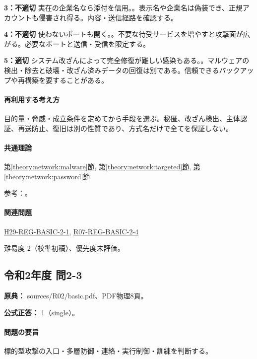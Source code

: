 \noindent\textbf{3：不適切} 実在の企業名なら添付を信用。。表示名や企業名は偽装でき、正規アカウントも侵害され得る。内容・送信経路を確認する。\par

\noindent\textbf{4：不適切} 使わないポートも開く。。不要な待受サービスを増やすと攻撃面が広がる。必要なポートと送信・受信を限定する。\par

\noindent\textbf{5：適切} システム改ざんによって完全修復が難しい感染もある。。マルウェアの検出・除去と破壊・改ざん済みデータの回復は別である。信頼できるバックアップや再構築を要することがある。\par

\paragraph{再利用する考え方} 目的量・脅威・成立条件を定めてから手段を選ぶ。秘匿、改ざん検出、主体認証、再送防止、復旧は別の性質であり、方式名だけで全てを保証しない。

\paragraph{共通理論} \hyperref[theory:network:malware]{第\ref*{theory:network:malware}節}, \hyperref[theory:network:targeted]{第\ref*{theory:network:targeted}節}, \hyperref[theory:network:password]{第\ref*{theory:network:password}節}

\par 参考：\cite{net_target2020,net_ipa_account}。

\paragraph{関連問題} \hyperref[q:h29-reg-basic-2-1]{H29-REG-BASIC-2-1}, \hyperref[q:r07-reg-basic-2-4]{R07-REG-BASIC-2-4}

\par 難易度 2（校準初稿）、優先度未評価。

\subsection{令和2年度 問2-3}
\label{q:r02-reg-basic-2-3}

\noindent\textbf{原典：} sources/R02/basic.pdf、PDF物理8頁。

\textbf{公式正答：} 1（single）。

\paragraph{問題の要旨} 標的型攻撃の入口・多層防御・連絡・実行制御・訓練を判断する。

